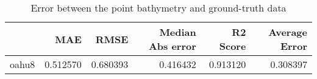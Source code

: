 \begin{table}[h!]
\caption{Error between the point bathymetry and ground-truth data}
\label{tab:oahu8_lidar_error}
\begin{tabular}{lrrrrr}
\toprule
 & MAE & RMSE & Median Abs error & R2 Score & Average Error \\
\midrule
oahu8 & 0.512570 & 0.680393 & 0.416432 & 0.913120 & 0.308397 \\
\bottomrule
\end{tabular}
\end{table}
